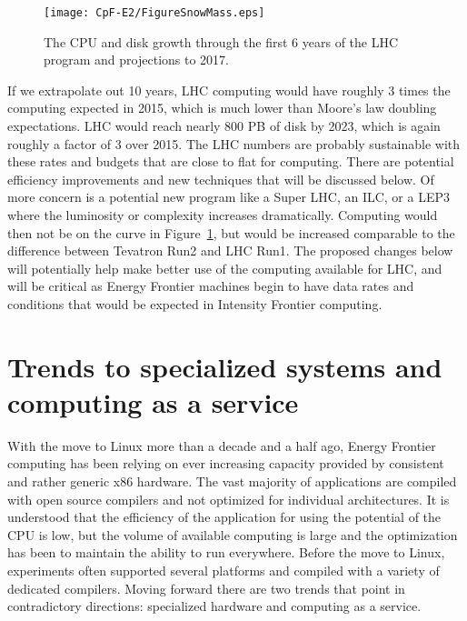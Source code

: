 \begin{figure}[htb]
\begin{center}
\texttt{[image: CpF-E2/FigureSnowMass.eps]}
\caption{The CPU and disk growth through the first 6 years of the LHC program
and projections to 2017.}
\label{fig:growth}
\end{center}
\end{figure}



If we extrapolate out 10 years, LHC computing would have roughly 3
times the computing expected in 2015, which is much lower than Moore's
law doubling expectations.  LHC would reach nearly 800 PB of disk by
2023, which is again roughly a factor of 3 over 2015.  The LHC numbers
are probably sustainable with these rates and budgets that are close to
flat for computing.  There are potential efficiency improvements and
new techniques that will be discussed below.  Of more concern is a
potential new program like a Super LHC, an ILC, or a LEP3 where the
luminosity or complexity increases dramatically.  Computing would then not
be on the curve in Figure~\ref{fig:growth}, but would be increased comparable
to the
difference between Tevatron Run2 and LHC Run1.  The proposed changes
below will potentially help make better use of the computing available
for LHC, and will be critical as Energy Frontier machines begin to
have data rates and conditions that would be expected in Intensity
Frontier computing.


\section{Trends to specialized systems and computing as a service}
\label{sec:comp-clouds}

With the move to Linux more than a decade and a half ago, Energy
Frontier computing has been relying on ever increasing capacity
provided by consistent and rather generic x86 hardware.  The vast
majority of applications are compiled with open source compilers and
not optimized for individual architectures.  It is understood that the
efficiency of the application for using the potential of the CPU is
low, but the volume of available computing is large and the
optimization has been to maintain the ability to run everywhere.
Before the move to Linux, experiments often supported several
platforms and compiled with a variety of dedicated compilers.  Moving
forward there are two trends that point in contradictory directions:
specialized hardware and computing as a service.

